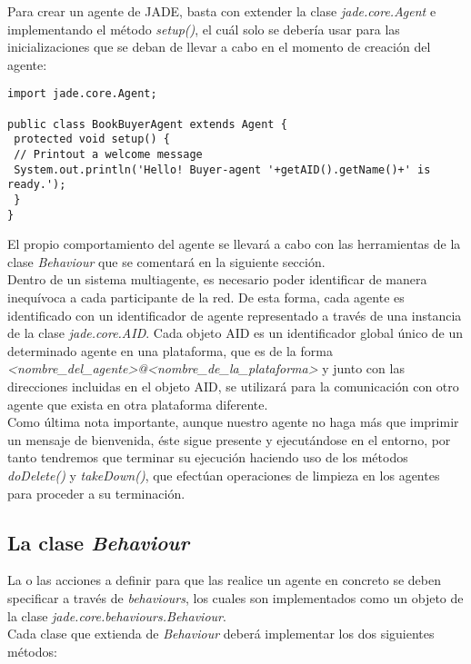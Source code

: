 Para crear un agente de JADE, basta con extender la clase \textit{jade.core.Agent} e implementando el método \textit{setup()}, el cuál solo se debería usar para las inicializaciones que se deban de llevar a cabo en el momento de creación del agente:
\begin{lstlisting}
import jade.core.Agent;

public class BookBuyerAgent extends Agent {
 protected void setup() {
 // Printout a welcome message
 System.out.println('Hello! Buyer-agent '+getAID().getName()+' is ready.');
 }
}
\end{lstlisting}

El propio comportamiento del agente se llevará a cabo con las herramientas de la clase \textit{Behaviour} que se comentará en la siguiente sección.\\

Dentro de un sistema multiagente, es necesario poder identificar de manera inequívoca a cada participante de la red. De esta forma, cada agente es identificado con un identificador de agente representado a través de una instancia de la clase \textit{jade.core.AID}. Cada objeto AID es un identificador global único de un determinado agente en una plataforma, que es de la forma \textit{<nombre\_del\_agente>@<nombre\_de\_la\_plataforma>} y junto con las direcciones incluidas en el objeto AID, se utilizará para la comunicación con otro agente que exista en otra plataforma diferente.\\

Como última nota importante, aunque nuestro agente no haga más que imprimir un mensaje de bienvenida, éste sigue presente y ejecutándose en el entorno, por tanto tendremos que terminar su ejecución haciendo uso de los métodos \textit{doDelete()} y \textit{takeDown()}, que efectúan operaciones de limpieza en los agentes para proceder a su terminación.

\subsection{La clase \textit{Behaviour}}

La o las acciones a definir para que las realice un agente en concreto se deben specificar a través de \textit{behaviours}, los cuales son implementados como un objeto de la clase \textit{jade.core.behaviours.Behaviour}.\\

Cada clase que extienda de \textit{Behaviour} deberá implementar los dos siguientes métodos:

